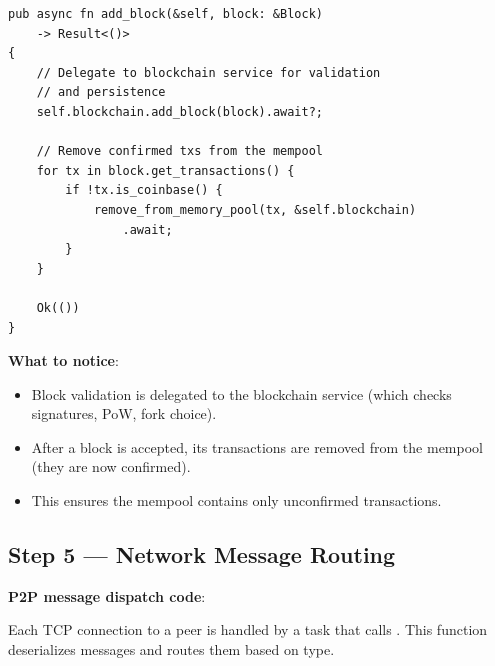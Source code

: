 \begin{listing}[H]
\caption{Block acceptance entry point ()}
\label{lst:9-8-4}
\begin{verbatim}
pub async fn add_block(&self, block: &Block)
    -> Result<()>
{
    // Delegate to blockchain service for validation
    // and persistence
    self.blockchain.add_block(block).await?;

    // Remove confirmed txs from the mempool
    for tx in block.get_transactions() {
        if !tx.is_coinbase() {
            remove_from_memory_pool(tx, &self.blockchain)
                .await;
        }
    }

    Ok(())
}
\end{verbatim}
\end{listing}

\textbf{What to notice}:
\begin{itemize}
  \item Block validation is delegated to the blockchain service (which checks signatures, PoW, fork choice).
  \item After a block is accepted, its transactions are removed from the mempool (they are now confirmed).
  \item This ensures the mempool contains only unconfirmed transactions.
\end{itemize}

\subsection{Step 5 --- Network Message Routing}
\label{sec:ch09-8-step5}

\textbf{P2P message dispatch code}: 

Each TCP connection to a peer is handled by a task that calls . This function deserializes messages and routes them based on type.

